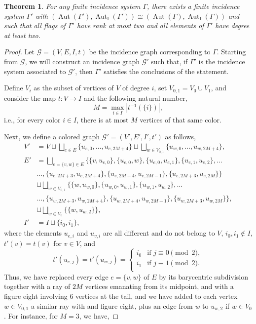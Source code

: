 \documentclass{amsart}
\newtheorem{theorem}{Theorem}[section]
\theoremstyle{definition}
\theoremstyle{remark}
\newcommand{\Aut}{\operatorname{Aut}}
\newcommand{\AutI}{\Aut_{\text{I}}}
\begin{document}
\begin{theorem}\label{thm:improving incidence system}
For any finite incidence system $\Gamma$, there exists a finite incidence system $\Gamma'$ with $(\Aut(\Gamma'),\AutI(\Gamma'))\cong (\Aut(\Gamma),\AutI(\Gamma))$ and such that all flags of $\Gamma'$ have rank at most two and all elements of $\Gamma'$ have degree at least two.
\end{theorem}
\begin{proof}
Let $\mathcal{G}=(V,E,I,t)$  be the incidence graph corresponding to $\Gamma$. Starting from $\mathcal{G}$, we will construct an incidence graph $\mathcal{G}'$ such that, if $\Gamma'$ is the incidence system associated to $\mathcal{G}'$, then $\Gamma'$ satisfies the conclusions of the statement.

Define $V_i$ as the subset of vertices of $V$ of degree $i$, set $V_{0,1}=V_0\cup V_1$, and consider the map $t\colon V\to I$ and the following natural number,
\[
M=\max_{i\in I}{|t^{-1}(\{i\})|},
\]
i.e., for every color $i\in I$, there is at most $M$ vertices of that same color. 

Next, we define a colored graph $\mathcal{G}'=(V',E',I',t')$ as follows,
\begin{align*}
V'&=V\sqcup \bigsqcup_{e\in E} \{u_{e,0},\ldots,u_{e,{2M+4}}\}\sqcup \bigsqcup_{w\in V_{0,1}} \{u_{w,0},\ldots,u_{w,{2M+4}}\},\\
E'&=\bigsqcup_{e=\{v,w\}\in E}\big\{\{v,u_{e,0}\},\{u_{e,0},w\},\{u_{e,0},u_{e,1}\},\{u_{e,1},u_{e,2}\},\ldots\\
&\ldots,\{u_{e,2M+3},u_{e,2M+4}\},\{u_{e,2M+4},u_{e,2M-1}\},\{u_{e,2M+3},u_{e,2M}\}\big\}\\
&\sqcup \bigsqcup_{w\in V_{0,1}} \big\{\{w,u_{w,0}\},\{u_{w,0},u_{w,1}\},\{u_{w,1},u_{w,2}\},\ldots\\
&\ldots,\{u_{w,2M+3},u_{w,2M+4}\},\{u_{w,2M+4},u_{w,2M-1}\},\{u_{w,2M+3},u_{w,2M}\}\big\},\\
&\sqcup \bigsqcup_{w\in V_0} \big\{\{w,u_{w,2}\}\big\},\\
I'&=I\sqcup \{i_0,i_1\},
\end{align*}
where the elements $u_{e,i}$ and $u_{v,i}$ are all different and do not belong to $V$, $i_0,i_1\notin I$, $t'(v)=t(v)$ for $v\in V$, and 
\[
t'(u_{e,j})=t'(u_{w,j})=\begin{cases} i_0&\text{if $j\equiv 0\pmod 2$},\\
i_1&\text{if $j\equiv 1\pmod 2$.}\\
\end{cases}
\]
Thus, we have replaced every edge $e=\{v,w\}$ of $E$ by its barycentric subdivision together with a ray of $2M$ vertices emanating from its midpoint, and with a figure eight involving $6$ vertices at the tail, and we have added to each vertex $w\in V_{0,1}$  a similar ray with and figure eight, plus an edge from $w$ to $u_{w,2}$ if $w\in V_0$. For instance, for $M=3$, we have, 
    

\end{proof}
\end{document}
